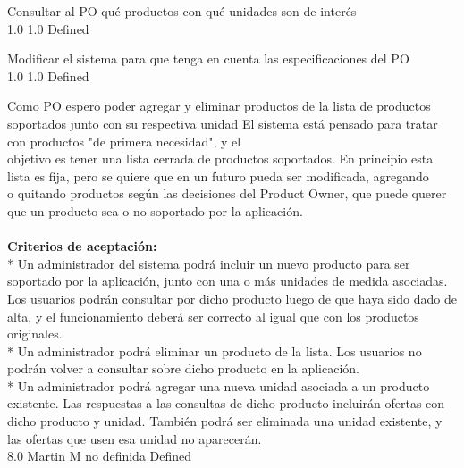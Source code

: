 		{Consultar al PO qué productos con qué unidades son de interés} %
		{\\
} %
		{1.0} %
		{} %
		{1.0} %
		{Defined} %

		{Modificar el sistema para que tenga en cuenta las especificaciones del PO} %
		{\\
} %
		{1.0} %
		{} %
		{1.0} %
		{Defined} %


\vspace{20pt}

	{Como PO espero poder agregar y eliminar productos de la lista de productos soportados junto con su respectiva unidad} %
	{El sistema está pensado para tratar con productos "de primera necesidad", y el\\
objetivo es tener una lista cerrada de productos soportados. En principio esta\\
lista es fija, pero se quiere que en un futuro pueda ser modificada, agregando\\
o quitando productos según las decisiones del Product Owner, que puede querer\\
que un producto sea o no soportado por la aplicación.\\
  \\
\textbf{Criterios de aceptación:}\\
* Un administrador del sistema podrá incluir un nuevo producto para ser soportado por la aplicación, junto con una o más unidades de medida asociadas. Los usuarios podrán consultar por dicho producto luego de que haya sido dado de alta, y el funcionamiento deberá ser correcto al igual que con los productos originales.  \\
* Un administrador podrá eliminar un producto de la lista. Los usuarios no podrán volver a consultar sobre dicho producto en la aplicación.  \\
* Un administrador podrá agregar una nueva unidad asociada a un producto existente. Las respuestas a las consultas de dicho producto incluirán ofertas con dicho producto y unidad. También podrá ser eliminada una unidad existente, y las ofertas que usen esa unidad no aparecerán.\\
} %
	{} %
	{8.0} %
	{Martin M} %
	{no definida} %
	{Defined} %


